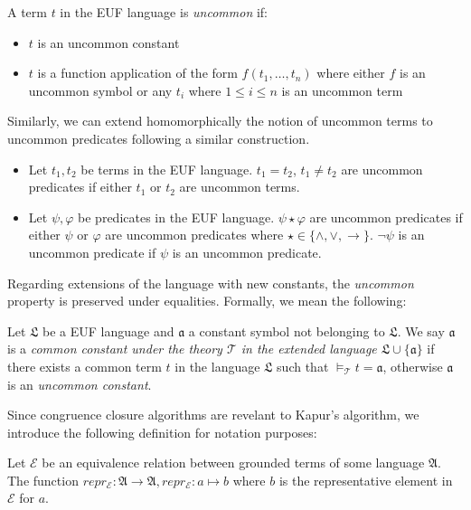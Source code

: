 \begin{definition}
  A term $t$ in the EUF language is \emph{uncommon} if:
  \begin{itemize}
    \item $t$ is an uncommon constant
    \item $t$ is a function application of the form $f(t_1, \dots, t_n)$
      where either $f$ is an uncommon symbol or any $t_i$ where $1 \leq i \leq n$ 
      is an uncommon term
  \end{itemize}

  Similarly, we can extend homomorphically the notion of uncommon terms to uncommon 
  predicates following a similar construction.

  \begin{itemize}
    \item Let $t_1, t_2$ be terms in the EUF language. $t_1 = t_2$,
      $t_1 \neq t_2$ are uncommon predicates if either $t_1$ or $t_2$
      are uncommon terms.
    \item Let $\psi, \varphi$ be predicates in the EUF language. 
      $\psi \star \varphi$ are uncommon predicates if either $\psi$
      or $\varphi$ are uncommon predicates where $\star \in \{ \land,
      \lor, \rightarrow \}$. $\neg \psi$ is an uncommon predicate if $\psi$
      is an uncommon predicate.

  \end{itemize}
\end{definition}


Regarding extensions of the language with new constants, the \emph{uncommon} property
is preserved under equalities. Formally, we mean the following:

\begin{definition}
  Let $\mathfrak{L}$ be a EUF language and $\mathfrak{a}$ a constant symbol
  not belonging to $\mathfrak{L}$. We say $\mathfrak{a}$ is a \emph{common constant under
  the theory $\mathcal{T}$ in the extended language $\mathfrak{L} \cup \{\mathfrak{a}\}$}
  if there exists a common term $t$ in the language $\mathfrak{L}$ such that 
  $\models_{\mathcal{T}} t = \mathfrak{a}$, otherwise $\mathfrak{a}$ is an \emph{
  uncommon constant}.
\end{definition}

Since congruence closure algorithms are revelant to Kapur's algorithm, we introduce the 
following definition for notation purposes:

\begin{definition}
  Let $\mathcal{E}$ be an equivalence relation between grounded terms of some 
  language $\mathfrak{A}$. The function $repr_{\mathcal{E}} : \mathfrak{A} \rightarrow 
  \mathfrak{A} , repr_{\mathcal{E}} : a \mapsto b$  where $b$ is the representative
  element in $\mathcal{E}$ for $a$.

\end{definition}

